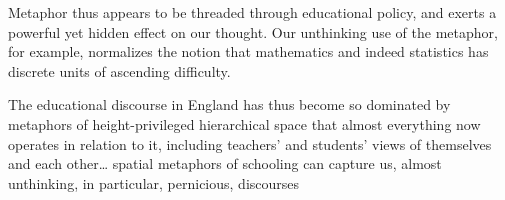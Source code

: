 Metaphor thus appears to be threaded through educational policy, and
exerts a powerful yet hidden effect on our thought.  Our unthinking
use of the  metaphor, for example, normalizes the
notion that mathematics and indeed statistics has discrete units of
ascending difficulty.





\begin{singlespace}
\epigraph{The educational discourse in England has thus become so
  dominated by metaphors of height-privileged hierarchical space that
  almost everything now operates in relation to it, including
  teachers' and students' views of themselves and each other\ldots
  spatial metaphors of schooling can capture us, almost unthinking, in
  particular, pernicious, discourses}{}
\end{singlespace}
